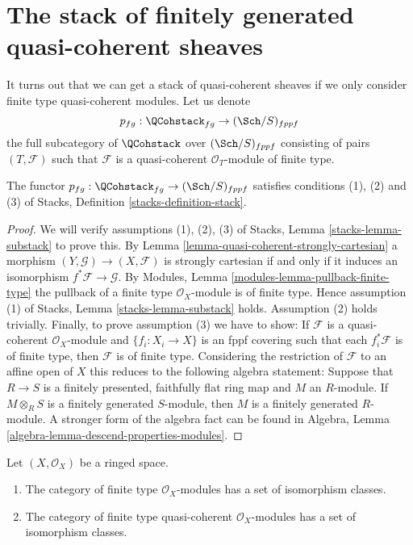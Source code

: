 \section{The stack of finitely generated quasi-coherent sheaves}
\label{section-stack-of-finitely-generated-quasi-coherent-sheaves}

\noindent
It turns out that we can get a stack of quasi-coherent sheaves
if we only consider finite type quasi-coherent modules.
Let us denote
$$
p_{fg} : \QCohstack_{fg} \to (\Sch/S)_{fppf}
$$
the full subcategory of $\QCohstack$ over $(\Sch/S)_{fppf}$
consisting of pairs $(T, \mathcal{F})$ such that $\mathcal{F}$
is a quasi-coherent $\mathcal{O}_T$-module of finite type.

\begin{lemma}
\label{lemma-stack-of-finite-type-quasi-coherent-sheaves}
The functor $p_{fg} : \QCohstack_{fg} \to (\Sch/S)_{fppf}$
satisfies conditions (1), (2) and (3) of
Stacks, Definition \ref{stacks-definition-stack}.
\end{lemma}

\begin{proof}
We will verify assumptions (1), (2), (3) of
Stacks, Lemma \ref{stacks-lemma-substack}
to prove this. By
Lemma \ref{lemma-quasi-coherent-strongly-cartesian}
a morphism $(Y, \mathcal{G}) \to (X, \mathcal{F})$ is
strongly cartesian if and only if it induces an isomorphism
$f^*\mathcal{F} \to \mathcal{G}$. By
Modules, Lemma \ref{modules-lemma-pullback-finite-type}
the pullback of a finite type $\mathcal{O}_X$-module is of finite
type. Hence assumption (1) of
Stacks, Lemma \ref{stacks-lemma-substack}
holds. Assumption (2) holds trivially.
Finally, to prove assumption (3) we have to show:
If $\mathcal{F}$ is a quasi-coherent $\mathcal{O}_X$-module
and $\{f_i : X_i \to X\}$ is an fppf covering such that each
$f_i^*\mathcal{F}$ is of finite type, then $\mathcal{F}$ is of
finite type. Considering the restriction of $\mathcal{F}$ to
an affine open of $X$ this reduces to the following algebra statement:
Suppose that $R \to S$ is a finitely presented, faithfully flat ring map
and $M$ an $R$-module. If $M \otimes_R S$ is a finitely generated
$S$-module, then $M$ is a finitely generated $R$-module.
A stronger form of the algebra fact can be found in
Algebra, Lemma \ref{algebra-lemma-descend-properties-modules}.
\end{proof}

\begin{lemma}
\label{lemma-finite-type}
Let $(X, \mathcal{O}_X)$ be a ringed space.
\begin{enumerate}
\item The category of finite type $\mathcal{O}_X$-modules has a
set of isomorphism classes.
\item The category of finite type quasi-coherent
$\mathcal{O}_X$-modules has a set of isomorphism classes.
\end{enumerate}
\end{lemma}

